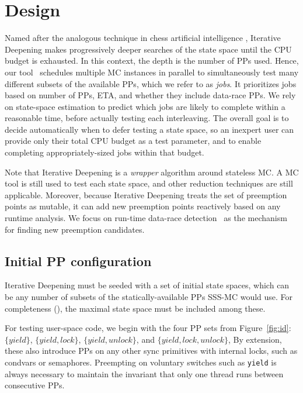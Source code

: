 \section{Design}
\label{sec:design}

Named after the analogous technique in chess artificial intelligence \cite{iterative-deepening-chess-ai},
Iterative Deepening
makes progressively deeper searches of the state space until the CPU budget is exhausted.
In this context, the depth is the number of PPs used.
Hence, our tool \quicksand~schedules multiple MC instances in parallel to simultaneously test many different subsets of the available PPs,
which we refer to as {\em jobs}.
It prioritizes jobs based on number of PPs, ETA, and whether they include data-race PPs.
We rely on state-space estimation \cite{estimation}
to predict which jobs are likely to complete within a reasonable time,
before actually testing each interleaving.
The overall goal is to decide automatically when to defer testing a state space,
so an inexpert user can provide only their total CPU budget as a test parameter,
and to enable completing appropriately-sized jobs within that budget.

Note that Iterative Deepening is a {\em wrapper} algorithm around stateless MC.
A MC tool is still used to test each state space, and other reduction techniques are still applicable.
Moreover, because Iterative Deepening treats the set of preemption points as mutable,
it can add new preemption points reactively based on any runtime analysis.
We focus on run-time data-race detection~\cite{hybriddatarace,tsan,ifrit} as the mechanism for finding new preemption candidates.


\subsection{Initial PP configuration}

Iterative Deepening must be seeded with a set of initial state spaces,
which can be any number of subsets of the statically-available PPs SSS-MC would use.
For completeness (\sect{\ref{sec:totalverif}}), the maximal state space must be included among these.

For testing user-space code, we begin with the four PP sets from Figure~\ref{fig:id}:
$\{yield\}$,
$\{yield,lock\}$,
$\{yield,unlock\}$,
and $\{yield,lock,unlock\}$,
By extension, these also introduce PPs on any other sync primitives
with internal locks,
such as condvars or semaphores.
Preempting on voluntary switches such as {\tt yield} is always necessary to maintain the invariant that only one thread runs between consecutive PPs.


